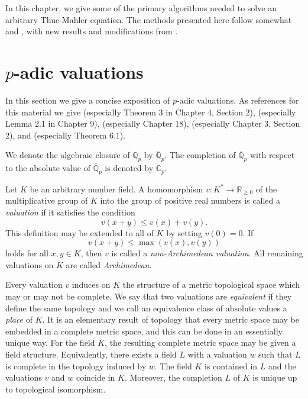 \documentclass[11pt]{report}
\theoremstyle{definition}
\begin{document}
In this chapter, we give some of the primary algorithms needed to solve an arbitrary Thue-Mahler equation. The methods presented here follow somewhat \cite{Ham} and \cite{TW3}, with new results and modifications from \cite{GhKaMaSi}.


\section{$p$-adic valuations}
\label{sec:pAdicValuations}

In this section we give a concise exposition of $p$-adic valuations. As references for this material we give \cite{BS} (especially Theorem 3 in Chapter 4, Section 2), \cite{Ca} (especially Lemma 2.1 in Chapter 9), \cite{Has2} (especially Chapter 18), \cite{Ko} (especially Chapter 3, Section 2), and \cite{Nark} (especially Theorem 6.1).

We denote the algebraic closure of $\mathbb{Q}_p$ by $\overline{\mathbb{Q}}_p$. The completion of $\overline{\mathbb{Q}}_p$ with respect to the absolute value of $\overline{\mathbb{Q}}_p$ is denoted by $\mathbb{C}_p$.

Let $K$ be an arbitrary number field. A homomorphism $v: K^* \to \mathbb{R}_{\geq 0}$ of the multiplicative group of $K$ into the group of positive real numbers is called a \textit{valuation} if it satisfies the condition
\[v(x+y) \leq v(x) + v(y).\]
This definition may be extended to all of $K$ by setting $v(0) = 0$. If
\[v(x+y) \leq \max(v(x),v(y))\]
holds for all $x,y \in K$, then $v$ is called a \textit{non-Archimedean valuation}. All remaining valuations on $K$ are called \textit{Archimedean}.

Every valuation $v$ induces on $K$ the structure of a metric topological space which may or may not be complete. We say that two valuations are \textit{equivalent} if they define the same topology and we call an equivalence class of absolute values a \textit{place} of $K$. It is an elementary result of topology that every metric space may be embedded in a complete metric space, and this can be done in an essentially unique way. For the field $K$, the resulting complete metric space may be given a field structure. Equivalently, there exists a field $L$ with a valuation $w$ such that $L$ is complete in the topology induced by $w$. The field $K$ is contained in $L$ and the valuations $v$ and $w$ coincide in $K$. Moreover, the completion $L$ of $K$ is unique up to topological isomorphism.
\end{document}
